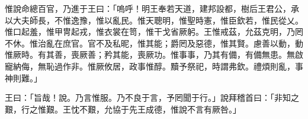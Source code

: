 
\begin{pinyinscope}
惟說命總百官，乃進于王曰：「嗚呼！明王奉若天道，建邦設都，樹后王君公，承以大夫師長，不惟逸豫，惟以亂民。惟天聰明，惟聖時憲，惟臣欽若，惟民從乂。惟口起羞，惟甲冑起戎，惟衣裳在笥，惟干戈省厥躬。王惟戒茲，允茲克明，乃罔不休。惟治亂在庶官。官不及私昵，惟其能；爵罔及惡德，惟其賢。慮善以動，動惟厥時。有其善，喪厥善；矜其能，喪厥功。惟事事，乃其有備，有備無患。無啟寵納侮，無恥過作非。惟厥攸居，政事惟醇。黷予祭祀，時謂弗欽。禮煩則亂，事神則難。」

王曰：「旨哉！說。乃言惟服。乃不良于言，予罔聞于行。」說拜稽首曰：「非知之艱，行之惟艱。王忱不艱，允協于先王成德，惟說不言有厥咎。」


\end{pinyinscope}